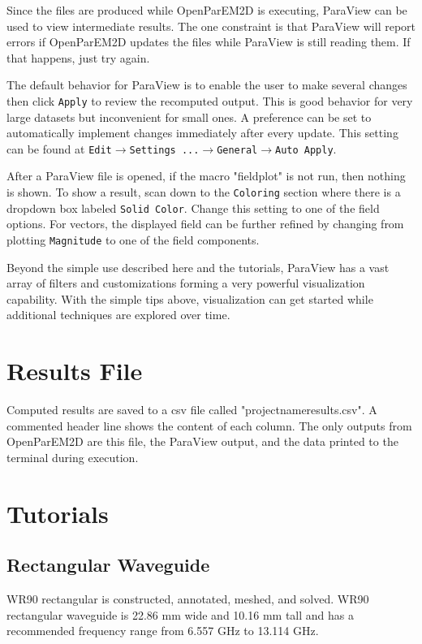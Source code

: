 \documentclass[titlepage]{article}
\renewcommand\_{\textunderscore\linebreak[1]}
\begin{document}
Since the files are produced while OpenParEM2D is executing, ParaView can be used to view intermediate results.  The one constraint is that ParaView will report errors if OpenParEM2D updates the files while ParaView is still reading them.  If that happens, just try again.

The default behavior for ParaView is to enable the user to make several changes then click \texttt{Apply} to review the recomputed output.  This is good behavior for very large datasets but inconvenient for small ones.  A preference can be set to automatically implement changes immediately after every update.  This setting can be found at \texttt{Edit}$\rightarrow$\texttt{Settings ...}$\rightarrow$\texttt{General}$\rightarrow$\texttt{Auto Apply}.

After a ParaView file is opened, if the macro "field\_plot" is not run, then nothing is shown.  To show a result, scan down to the \texttt{Coloring} section where there is a dropdown box labeled \texttt{Solid Color}.  Change this setting to one of the field options.  For vectors, the displayed field can be further refined by changing from plotting \texttt{Magnitude} to one of the field components.


Beyond the simple use described here and the tutorials, ParaView has a vast array of filters and customizations forming a very powerful visualization capability. With the simple tips above, visualization can get started while additional techniques are explored over time.

\section{Results File}

Computed results are saved to a csv file called "project\_name\_results.csv".  A commented header line shows the content of each column.  The only outputs from OpenParEM2D are this file, the ParaView output, and the data printed to the terminal during execution.

\section{Tutorials}

\subsection{Rectangular Waveguide}
WR90 rectangular is constructed, annotated, meshed, and solved.  WR90 rectangular waveguide is 22.86 mm wide and 10.16 mm tall and has a recommended frequency range from 6.557 GHz to 13.114 GHz.
\end{document}
